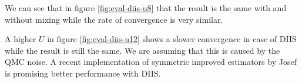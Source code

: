 We can see that in figure \ref{fig:eval-diis-u8} that the result is the same with and without mixing while the rate of convergence is very similar.

A higher $U$ in figure \ref{fig:eval-diis-u12} shows a slower convergence in case of DIIS while the result is still the same. We are assuming that this is caused by the QMC noise. A recent implementation of symmetric improved estimators\cite{symmetric} by Josef is promising better performance with DIIS.

